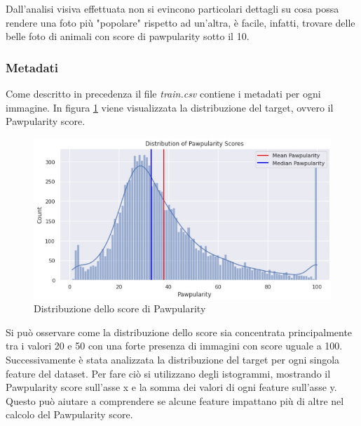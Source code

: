     Dall'analisi visiva effettuata non si evincono particolari dettagli su cosa possa rendere una foto più "popolare" rispetto ad un'altra, è facile, infatti, trovare delle belle foto di animali con score di pawpularity sotto il 10.

    \subsubsection{Metadati}
    Come descritto in precedenza il file \textit{train.csv} contiene i metadati per ogni immagine. In figura \ref{fig:target} viene visualizzata la distribuzione del target, ovvero il Pawpularity score.
    \begin{figure}[H]
        \centering
        \includegraphics[scale=0.6]{Plot/distribution_target.jpg}
        \caption{Distribuzione dello score di Pawpularity}
        \label{fig:target}
    \end{figure}

    Si può osservare come la distribuzione dello score sia concentrata principalmente tra i valori 20 e 50 con una forte presenza di immagini con score uguale a 100.
    Successivamente è stata analizzata la distribuzione del target per ogni singola feature del dataset.
    Per fare ciò si utilizzano degli istogrammi, mostrando il Pawpularity score sull'asse x e la somma dei valori di ogni feature sull'asse y. Questo può aiutare a comprendere se alcune feature impattano più di altre nel calcolo del Pawpularity score.

